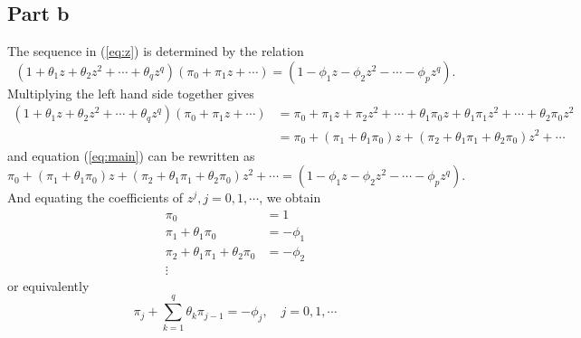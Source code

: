 \documentclass[11pt, oneside]{article}   	%
\begin{document}
\subsection{Part b}
The sequence in (\ref{eq:z}) is determined by the relation
\begin{equation}\label{eq:main}
(1+\theta_{1}z +\theta_{2}z^{2} + \cdots + \theta_{q}z^{q})(\pi_{0} + \pi_{1}z + \cdots) = (1-\phi_{1}z-\phi_{2}z^{2}-\cdots-\phi_{p}z^{q}).
\end{equation}
Multiplying the left hand side together gives 
\begin{equation}
\begin{aligned}
(1+\theta_{1}z +\theta_{2}z^{2} + \cdots + \theta_{q}z^{q})(\pi_{0} + \pi_{1}z + \cdots)&=\pi_{0}+\pi_{1}z+\pi_{2}z^{2}+\cdots +\theta_{1}\pi_{0}z+\theta_{1}\pi_{1}z^{2}+\cdots+\theta_{2}\pi_{0}z^{2}\\
&=\pi_{0}+(\pi_{1}+\theta_{1}\pi_{0})z+(\pi_{2}+\theta_{1}\pi_{1}+\theta_{2}\pi_{0})z^{2}+ \cdots \nonumber
\end{aligned}
\end{equation}
and equation (\ref{eq:main}) can be rewritten as 
\begin{equation}\label{eq:main1}
\pi_{0}+(\pi_{1}+\theta_{1}\pi_{0})z+(\pi_{2}+\theta_{1}\pi_{1}+\theta_{2}\pi_{0})z^{2}+ \cdots = (1-\phi_{1}z-\phi_{2}z^{2}-\cdots-\phi_{p}z^{q}).
\end{equation}
And equating the coefficients of $z^{j}, j = 0, 1, \cdots$, we obtain
\begin{equation}
\begin{aligned}
\pi_{0} &= 1\\
\pi_{1}+\theta_{1}\pi_{0}&=-\phi_{1}\\
\pi_{2}+\theta_{1}\pi_{1}+\theta_{2}\pi_{0} &=-\phi_{2}\\
\vdots\nonumber
\end{aligned}
\end{equation}
or equivalently
\begin{equation}
\pi_{j}+\sum_{k=1}^{q}\theta_{k}\pi_{j-1} = -\phi_{j}, \quad j =0,1, \cdots
\end{equation}
\end{document}
